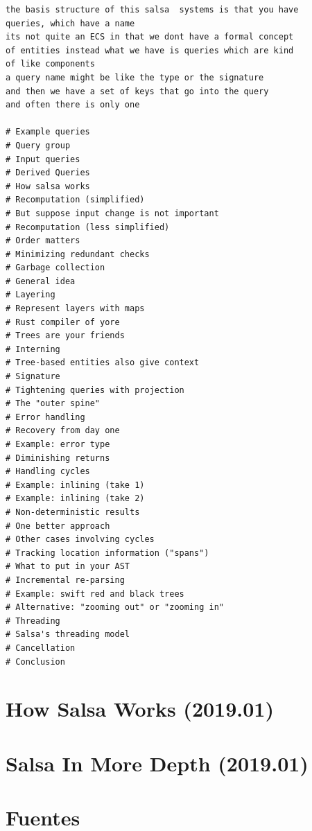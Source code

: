 \documentclass[12pt, a4paper]{report}
\begin{document}
\begin{Verbatim}
the basis structure of this salsa  systems is that you have
queries, which have a name
its not quite an ECS in that we dont have a formal concept
of entities instead what we have is queries which are kind
of like components
a query name might be like the type or the signature
and then we have a set of keys that go into the query
and often there is only one

# Example queries
# Query group
# Input queries
# Derived Queries
# How salsa works
# Recomputation (simplified)
# But suppose input change is not important
# Recomputation (less simplified)
# Order matters
# Minimizing redundant checks
# Garbage collection
# General idea
# Layering
# Represent layers with maps
# Rust compiler of yore
# Trees are your friends
# Interning
# Tree-based entities also give context
# Signature
# Tightening queries with projection
# The "outer spine"
# Error handling
# Recovery from day one
# Example: error type
# Diminishing returns
# Handling cycles
# Example: inlining (take 1)
# Example: inlining (take 2)
# Non-deterministic results
# One better approach
# Other cases involving cycles
# Tracking location information ("spans")
# What to put in your AST
# Incremental re-parsing
# Example: swift red and black trees
# Alternative: "zooming out" or "zooming in"
# Threading
# Salsa's threading model
# Cancellation
# Conclusion
\end{Verbatim}

\section*{How Salsa Works (2019.01)}
\cite{niko2019salsaworks}

\section*{Salsa In More Depth (2019.01)}
\cite{niko2019salsadepth}

\section*{Fuentes}
\end{document}
